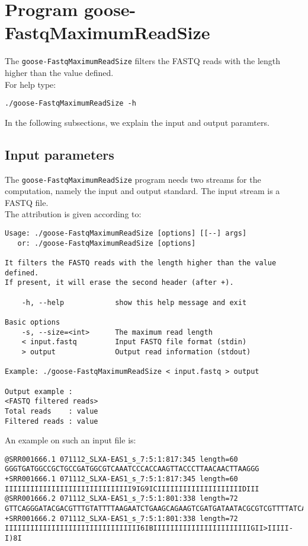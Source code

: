 \section{Program goose-FastqMaximumReadSize}
The \texttt{goose-FastqMaximumReadSize} filters the FASTQ reads with the length higher than the value defined.\\
For help type:
\begin{lstlisting}
./goose-FastqMaximumReadSize -h
\end{lstlisting}
In the following subsections, we explain the input and output paramters.

\subsection*{Input parameters}

The \texttt{goose-FastqMaximumReadSize} program needs two streams for the computation,
namely the input and output standard. The input stream is a FASTQ file.\\
The attribution is given according to:
\begin{lstlisting}
Usage: ./goose-FastqMaximumReadSize [options] [[--] args]
   or: ./goose-FastqMaximumReadSize [options]

It filters the FASTQ reads with the length higher than the value defined. 
If present, it will erase the second header (after +).

    -h, --help            show this help message and exit

Basic options
    -s, --size=<int>      The maximum read length
    < input.fastq         Input FASTQ file format (stdin)
    > output              Output read information (stdout)

Example: ./goose-FastqMaximumReadSize < input.fastq > output

Output example :
<FASTQ filtered reads>
Total reads    : value
Filtered reads : value
\end{lstlisting}
An example on such an input file is:
\begin{lstlisting}
@SRR001666.1 071112_SLXA-EAS1_s_7:5:1:817:345 length=60
GGGTGATGGCCGCTGCCGATGGCGTCAAATCCCACCAAGTTACCCTTAACAACTTAAGGG
+SRR001666.1 071112_SLXA-EAS1_s_7:5:1:817:345 length=60
IIIIIIIIIIIIIIIIIIIIIIIIIIIIII9IG9ICIIIIIIIIIIIIIIIIIIIIDIII
@SRR001666.2 071112_SLXA-EAS1_s_7:5:1:801:338 length=72
GTTCAGGGATACGACGTTTGTATTTTAAGAATCTGAAGCAGAAGTCGATGATAATACGCGTCGTTTTATCAT
+SRR001666.2 071112_SLXA-EAS1_s_7:5:1:801:338 length=72
IIIIIIIIIIIIIIIIIIIIIIIIIIIIIIII6IBIIIIIIIIIIIIIIIIIIIIIIIGII>IIIII-I)8I
\end{lstlisting}

